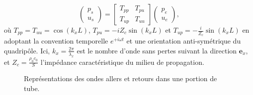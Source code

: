 \begin{equation}
    \begin{pmatrix}
        p_s\\
        u_s
    \end{pmatrix}=\begin{bmatrix}
        T_{pp} & T_{pu} \\
        T_{up} & T_{uu}
    \end{bmatrix}\begin{pmatrix}
        p_e\\
        u_e
    \end{pmatrix},
    \label{eq:TMatrix_TppTuu}
\end{equation}
où $T_{pp}=T_{uu}=\cos(k_x L)$, $T_{pu}=-i Z_c \sin(k_x L)$ et $T_{up}=-\frac{i}{Z_c}\sin(k_x L)$ en adoptant la convention temporelle $e^{+i\omega t}$ et une orientation anti-symétrique du quadripôle. Ici, $k_x = \frac{2\pi}{\lambda_x}$ est le nombre d'onde sans pertes suivant la direction $\mathbf e_x$, et $Z_c = \frac{\rho_0 c_0}{S}$ l'impédance caractéristique du milieu de propagation. 

\begin{figure}[!ht]
    \centering
    
    \caption{Représentations des ondes allers et retours dans une portion de tube.}%
    \label{fig:WavesInDuctPiece}
\end{figure}



